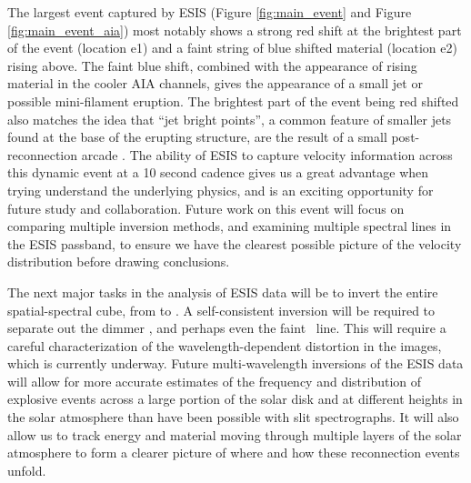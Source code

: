	The largest event captured by ESIS (Figure \ref{fig:main_event} and Figure \ref{fig:main_event_aia}) most notably shows a strong red shift at the brightest part of the event (location e1) and a faint string of blue shifted material (location e2) rising above.
	The faint blue shift, combined with the appearance of rising material in the cooler AIA channels, gives the appearance of a small jet or possible mini-filament eruption.
	The brightest part of the event being red shifted also matches the idea that ``jet bright points'', a common feature of smaller jets found at the base of the erupting structure, are the result of a small post-reconnection arcade \citep[see][and references therein]{Sterling2015}.
	The ability of ESIS to capture velocity information across this dynamic event at a 10 second cadence gives us a great advantage when trying understand the underlying physics, and is an exciting opportunity for future study and collaboration.
	Future work on this event will focus on comparing multiple inversion methods, and examining multiple spectral lines in the ESIS passband, to ensure we have the clearest possible picture of the velocity distribution before drawing conclusions.
	
	The next major tasks in the analysis of ESIS data will be to invert the entire spatial-spectral cube, from  to . 
	A self-consistent inversion will be required to separate out the dimmer \mgxdim, and perhaps even the faint \oiii \ line. This will require a careful characterization of the wavelength-dependent distortion in the images, which is currently underway.
	Future multi-wavelength inversions of the ESIS data will allow for more accurate estimates of the frequency and distribution of explosive events across a large portion of the solar disk and at different heights in the solar atmosphere than have been possible with slit spectrographs.
	It will also allow us to track energy and material moving through multiple layers of the solar atmosphere to form a clearer picture of where and how these reconnection events unfold. 
	
	

	  


